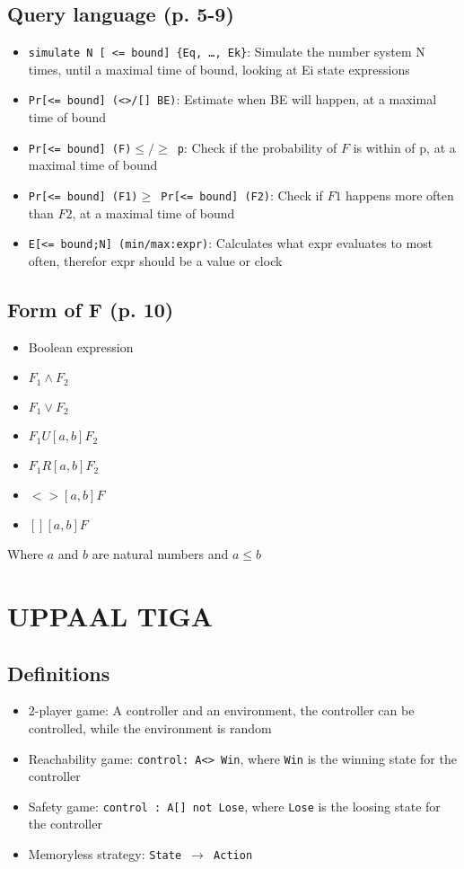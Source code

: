 \documentclass{article}
\begin{document}
		\subsection{Query language (p. 5-9)}
			\begin{itemize}
				\item \texttt{simulate N [ <= bound] \{Eq, \ldots, Ek\}}: Simulate the number system N times, until a maximal time of bound, looking at Ei state expressions
				\item \texttt{Pr[<= bound] (<>/[] BE)}: Estimate when BE will happen, at a maximal time of bound
				\item \texttt{Pr[<= bound] (F)$\leq/\geq$ p}: Check if the probability of $F$ is within of p, at a maximal time of bound
				\item \texttt{Pr[<= bound] (F1)$\geq$ Pr[<= bound] (F2)}: Check if $F1$ happens more often than $F2$, at a maximal time of bound
				\item \texttt{E[<= bound;N] (min/max:expr)}: Calculates what expr evaluates to most often, therefor expr should be a value or clock
			\end{itemize}

		\subsection{Form of F (p. 10)}
			\begin{itemize}
				\item Boolean expression
				\item $F_1\wedge F_2$
				\item $F_1\vee F_2$
				\item $F_1 U[a,b]F_2$
				\item $F_1 R[a,b]F_2$
				\item $<>[a,b]F$
				\item $[][a,b]F$
			\end{itemize}
			Where $a$ and $b$ are natural numbers and $a\leq b$
	
	\section{UPPAAL TIGA}
		\subsection{Definitions}
			\begin{itemize}
				\item 2-player game: A controller and an environment, the controller can be controlled, while the environment is random
				\item Reachability game: \texttt{control: A<> Win}, where \texttt{Win} is the winning state for the controller
				\item Safety game: \texttt{control : A[] not Lose}, where \texttt{Lose} is the loosing state for the controller
				\item Memoryless strategy: \texttt{State $\rightarrow$ Action}
			\end{itemize}
\end{document}
